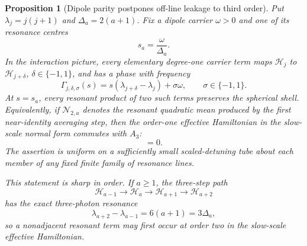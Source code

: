 \documentclass[11pt]{article}
\newtheorem{proposition}[theorem]{Proposition}
\theoremstyle{remark}
\begin{document}
\begin{proposition}[Dipole parity postpones off-line leakage to third order]
\label{prop:dipole-second-order-parity}
Put $\lambda_j=j(j+1)$ and $\Delta_a=2(a+1)$.  Fix a dipole carrier
$\omega>0$ and one of its resonance centres
\[
 s_a=\frac{\omega}{\Delta_a}.
\]
In the interaction picture, every elementary degree-one carrier term maps
$\mathcal H_j$ to $\mathcal H_{j+\delta}$, $\delta\in\{-1,1\}$, and has a
phase with frequency
\begin{equation}
 \Gamma_{j,\delta,\sigma}(s)
 =s(\lambda_{j+\delta}-\lambda_j)+\sigma\omega,
 \qquad \sigma\in\{-1,1\}.
 \label{eq:dipole-elementary-carrier-frequency}
\end{equation}
At $s=s_a$, every resonant product of two such terms preserves the spherical
shell.  Equivalently, if $\mathcal N_{2,a}$ denotes the resonant quadratic
mean produced by the first near-identity averaging step, then the order-one
effective Hamiltonian in the slow-scale normal form commutes with $A_3$:
\begin{equation}
 [A_3,\mathcal N_{2,a}(\tau)]=0.
 \label{eq:dipole-quadratic-normal-form-diagonal}
\end{equation}
The assertion is uniform on a sufficiently small scaled-detuning tube about
each member of any fixed finite family of resonance lines.

This statement is sharp in order.  If $a\geq1$, the three-step path
\[
 \mathcal H_{a-1}\longrightarrow\mathcal H_a
 \longrightarrow\mathcal H_{a+1}\longrightarrow\mathcal H_{a+2}
\]
has the exact three-photon resonance
\begin{equation}
 \lambda_{a+2}-\lambda_{a-1}
 =6(a+1)=3\Delta_a,
 \label{eq:dipole-three-photon-resonance}
\end{equation}
so a nonadjacent resonant term may first occur at order two in the slow-scale
effective Hamiltonian.
\end{proposition}
\end{document}

